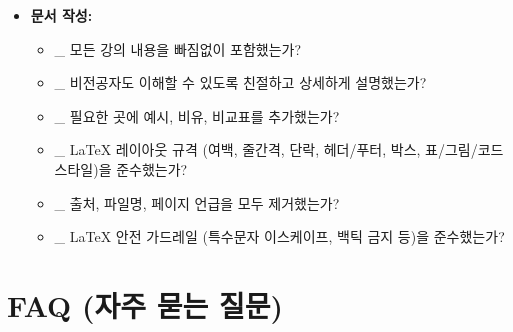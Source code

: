 \documentclass[11pt,a4paper]{article}
\begin{document}
\begin{itemize}
\begin{itemize}
        \item \_ `_rescued_data` 컬럼을 활용하여 잘못된 데이터를 식별하고 복구하는 방법을 이해하는가?
        \item \_ 스트리밍 작업을 시작하고 중지하는 방법을 아는가?
    \end{itemize}
    \item \textbf{문서 작성:}
    \begin{itemize}
        \item \_ 모든 강의 내용을 빠짐없이 포함했는가?
        \item \_ 비전공자도 이해할 수 있도록 친절하고 상세하게 설명했는가?
        \item \_ 필요한 곳에 예시, 비유, 비교표를 추가했는가?
        \item \_ LaTeX 레이아웃 규격 (여백, 줄간격, 단락, 헤더/푸터, 박스, 표/그림/코드 스타일)을 준수했는가?
        \item \_ 출처, 파일명, 페이지 언급을 모두 제거했는가?
        \item \_ LaTeX 안전 가드레일 (특수문자 이스케이프, 백틱 금지 등)을 준수했는가?
    \end{itemize}
\end{itemize}

\newpage
\section{FAQ (자주 묻는 질문)}
\end{document}
